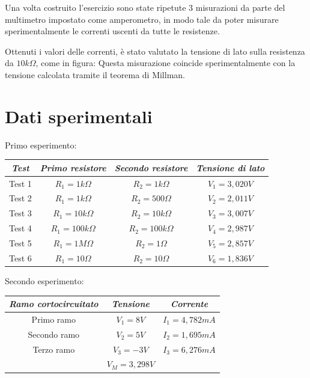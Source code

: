     Una volta costruito l'esercizio sono state ripetute 3 misurazioni da parte del multimetro impostato come 
    amperometro, in modo tale da poter misurare sperimentalmente le correnti uscenti da tutte le resistenze.\par
    Ottenuti i valori delle correnti, è stato valutato la tensione di lato sulla resistenza da $10k\Omega$, come in figura:
    Questa misurazione coincide sperimentalmente con la tensione calcolata tramite il teorema di Millman.\par



    \section{Dati sperimentali}
    \begin{center}
        Primo esperimento: \par
    \begin{tabular}{|c|c|c|c|}
        \hline
        \textit{Test} & \textit{Primo resistore} & \textit{Secondo resistore} & \textit{Tensione di lato} \\
        \hline
        Test 1 & $R_1 =1k\Omega$ & $R_2=1k\Omega$ & $V_1=3,020V$\\
        \hline
        Test 2 & $R_1 =1k\Omega$ & $R_2=500\Omega$ & $V_2=2,011V$\\
        \hline
        Test 3 & $R_1 =10k\Omega$ & $R_2=10k\Omega$ & $V_3=3,007V$\\
        \hline
        Test 4 & $R_1 =100k\Omega$ & $R_2=100k\Omega$ & $V_4=2,987V$\\
        \hline
        Test 5 & $R_1 =1M\Omega$ & $R_2=1\Omega$ & $V_5=2,857V$\\
        \hline
        Test 6 & $R_1 =10\Omega$ & $R_2=10\Omega$ & $V_6=1,836V$\\
        \hline
    
    \end{tabular}
    \end{center}
    
    \begin{center}
        Secondo esperimento: \par
    \begin{tabular}{|c|c|c|}
        \hline
        \textit{Ramo cortocircuitato} & \textit{Tensione} & \textit{Corrente} \\
        \hline
        Primo ramo & $V_1 = 8V$ & $I_1 = 4,782 mA$\\
        \hline
        Secondo ramo & $V_2 = 5V$ & $I_2 = 1,695 mA$\\
        \hline
        Terzo ramo & $V_3 = -3V$ & $I_3 = 6,276 mA$\\
        \hline
        & $V_M = 3,298V$&\\
        \hline
    
    \end{tabular}
    \end{center}



